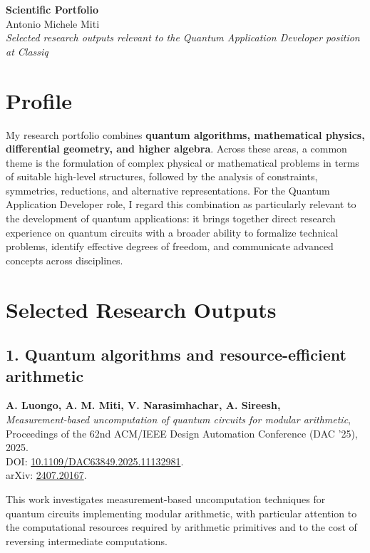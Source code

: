 \documentclass[10pt,a4paper]{article}
\begin{document}
\begin{center}
    {\Large \textbf{Scientific Portfolio}}\\[3pt]
    {\large Antonio Michele Miti}\\[3pt]
    \textit{Selected research outputs relevant to the Quantum Application Developer position at Classiq}
\end{center}

\vspace{0.5em}

\section*{Profile}

My research portfolio combines \textbf{quantum algorithms, mathematical physics, differential geometry, and higher algebra}. 
Across these areas, a common theme is the formulation of complex physical or mathematical problems in terms of suitable
high-level structures, followed by the analysis of constraints, symmetries, reductions, and alternative representations.
For the Quantum Application Developer role, I regard this combination as particularly relevant to the development of
quantum applications: it brings together direct research experience on quantum circuits with a broader ability to
formalize technical problems, identify effective degrees of freedom, and communicate advanced concepts across disciplines.

\section*{Selected Research Outputs}

\subsection*{1. Quantum algorithms and resource-efficient arithmetic}

\textbf{A. Luongo, A. M. Miti, V. Narasimhachar, A. Sireesh,}\\
\textit{Measurement-based uncomputation of quantum circuits for modular arithmetic},\\
Proceedings of the 62nd ACM/IEEE Design Automation Conference (DAC '25), 2025.\\
DOI: \href{https://doi.org/10.1109/DAC63849.2025.11132981}{10.1109/DAC63849.2025.11132981}.\\
arXiv: \href{https://arxiv.org/abs/2407.20167}{2407.20167}.

This work investigates measurement-based uncomputation techniques for quantum circuits implementing modular arithmetic,
with particular attention to the computational resources required by arithmetic primitives and to the cost of reversing
intermediate computations.
\end{document}
